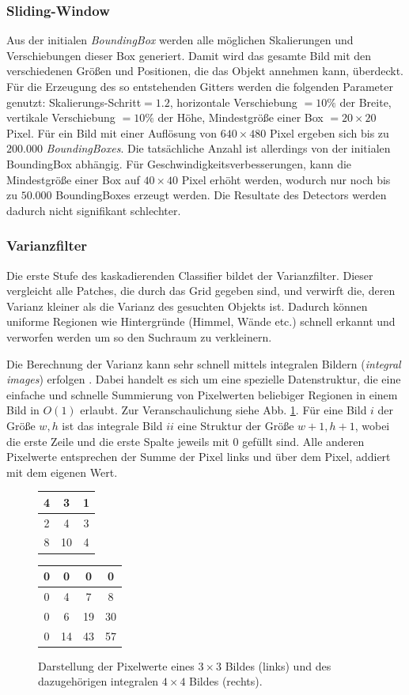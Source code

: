 	\subsubsection{Sliding-Window}
	Aus der initialen \textit{BoundingBox} werden alle möglichen Skalierungen und Verschiebungen dieser Box generiert. Damit wird das gesamte Bild mit den verschiedenen Größen und Positionen, die das Objekt annehmen kann, überdeckt. Für die Erzeugung des so entstehenden Gitters werden die folgenden Parameter genutzt: Skalierungs-Schritt$=1.2$, horizontale Verschiebung $=10\%$ der Breite, vertikale Verschiebung $=10\%$ der Höhe, Mindestgröße einer Box $=20\times20$ Pixel. Für ein Bild mit einer Auflösung von $640\times480$ Pixel ergeben sich bis zu $200.000$ \textit{BoundingBoxes}. Die tatsächliche Anzahl ist allerdings von der initialen BoundingBox abhängig. Für Geschwindigkeitsverbesserungen, kann die Mindestgröße einer Box auf $40\times40$ Pixel erhöht werden, wodurch nur noch bis zu $50.000$ BoundingBoxes erzeugt werden. Die Resultate des Detectors werden dadurch nicht signifikant schlechter.

	\subsubsection{Varianzfilter}
	Die erste Stufe des kaskadierenden Classifier bildet der Varianzfilter. Dieser vergleicht alle Patches, die durch das Grid gegeben sind, und verwirft die, deren Varianz kleiner als die Varianz des gesuchten Objekts ist. Dadurch können uniforme Regionen wie Hintergründe (Himmel, Wände etc.) schnell erkannt und verworfen werden um so den Suchraum zu verkleinern.

	Die Berechnung der Varianz kann sehr schnell mittels integralen Bildern (\textit{integral images}) erfolgen \cite{key-6}. Dabei handelt es sich um eine spezielle Datenstruktur, die eine einfache und schnelle Summierung von Pixelwerten beliebiger Regionen in einem Bild in $O(1)$ erlaubt. Zur Veranschaulichung siehe Abb. \ref{integralImg}. Für eine Bild $i$ der Größe $w,h$ ist das integrale Bild $ii$ eine Struktur der Größe $w+1,h+1$, wobei die erste Zeile und die erste Spalte jeweils mit $0$ gefüllt sind. Alle anderen Pixelwerte entsprechen der Summe der Pixel links und über dem Pixel, addiert mit dem eigenen Wert.

	\begin{figure}[h]
	\centering{}%
	\begin{tabular}{|c|c|c|}
	\hline
	4 & 3 & 1
	\tabularnewline
	\hline
	\hline
	2 & 4 & 3
	\tabularnewline
	\hline
	8 & 10 & 4
	\tabularnewline
	\hline
	\end{tabular} %
	\begin{tabular}{|c|c|c|c|}
	\hline
	0 & 0 & 0 & 0
	\tabularnewline
	\hline
	\hline
	0 & 4 & 7 & 8\tabularnewline
	\hline
	0 & 6 & 19 & 30
	\tabularnewline
	\hline
	0 & 14 & 43 & 57
	\tabularnewline
	\hline
	\end{tabular}\caption{Darstellung der Pixelwerte eines $3\times3$ Bildes (links) und des
	dazugehörigen integralen $4\times4$ Bildes (rechts).}
	\label{integralImg}
	\end{figure}

